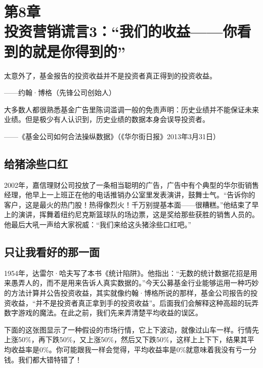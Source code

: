 
\section[第8章\q 投资营销谎言3：“我们的收益——你看到的就是你得到的”]{第8章\\ 投资营销谎言3：“我们的收益——你看到的就是你得到的”}

\begin{BookQuote}
太意外了，基金报告的投资收益并不是投资者真正得到的投资收益。

\hfill ——约翰·博格（先锋公司创始人）
\end{BookQuote}

\begin{BookQuote}
大多数人都很熟悉基金广告里陈词滥调一般的免责声明：历史业绩并不能保证未来业绩。但是极少有人认识到，历史业绩的数据本身会误导投资者。

\hfill ——《基金公司如何合法操纵数据》（《华尔街日报》2013年3月31日）
\end{BookQuote}

\subsection{给猪涂些口红}

2002年，嘉信理财公司投放了一条相当聪明的广告，广告中有个典型的华尔街销售经理，他早上一上班正在他的电话推销办公室里发表演讲，鼓舞士气。“告诉你的客户，这是最火的热门股！热得像烈火！千万别提基本面——很糟糕。”他结束了早上的演讲，挥舞着纽约尼克斯篮球队的场边票，这是奖给那些获胜的销售人员的。他最后大吼一声给大家祝威：“我们来给这头猪涂些口红吧。”

\subsection{只让我看好的那一面}

1954年，达雷尔·哈夫写了本书《统计陷阱》。他指出：“无数的统计数据花招是用来愚弄人的，而不是用来告诉人真实数据的。”今天公募基金行业能够运用一种巧妙的方法计算并公告投资收益，其实就像约翰·博格所说的那样，基金公司报告的投资收益，“并不是投资者真正拿到手的投资收益”。后面我们会解释这种高超的玩弄数字游戏的魔法。在此之前，我们先来弄清楚平均收益的误区。

下面的这张图显示了一种假设的市场行情，它上下波动，就像过山车一样。行情先上涨50\%，再下跌50\%，又上涨50\%，然后又下跌50\%，这样上上下下，结果其平均收益率是0\%。你可能跟我一样会觉得，平均收益率是0\%就意味着我没有亏一分钱。我们都大错特错了！

